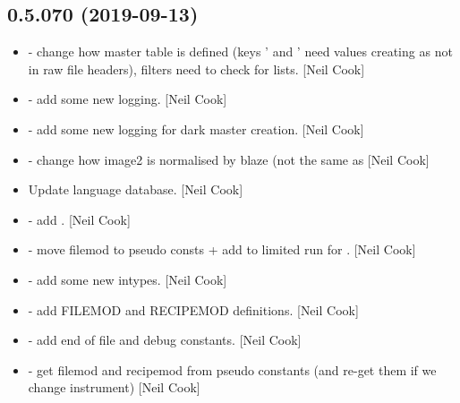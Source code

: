 \documentclass[a4paper,10pt,english]{report}
\begin{document}
\subsection{0.5.070 (2019-09-13)}
\label{\detokenize{misc/changelog:id72}}\begin{itemize}
\item {} 
 - change how master table is defined (keys
’ and ’ need values creating as not in raw
file headers), filters need to check for lists. {[}Neil Cook{]}

\item {} 
 - add some new logging. {[}Neil Cook{]}

\item {} 
 - add some new logging for dark master creation.
{[}Neil Cook{]}

\item {} 
 - change how image2 is
normalised by blaze (not the same as  {[}Neil Cook{]}

\item {} 
Update language database. {[}Neil Cook{]}

\item {} 
 - add . {[}Neil Cook{]}

\item {} 
 - move filemod to pseudo
consts + add  to limited run for . {[}Neil
Cook{]}

\item {} 
 - add some new intypes. {[}Neil Cook{]}

\item {} 
 - add FILEMOD and RECIPEMOD
definitions. {[}Neil Cook{]}

\item {} 
 - add end of file and debug constants.
{[}Neil Cook{]}

\item {} 
 - get filemod and recipemod from pseudo
constants (and re-get them if we change instrument) {[}Neil Cook{]}


\end{itemize}
\end{document}

